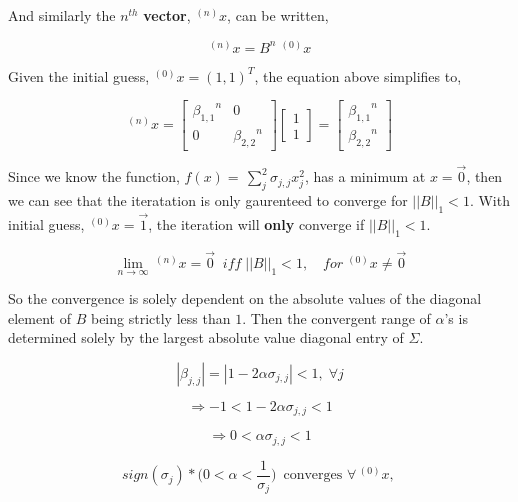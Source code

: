 \documentclass[11pt]{article}
\begin{document}
    And similarly the \(n^{th}\) \textbf{vector}, \(^{(n)}x\), can be
written,

\begin{equation} \tag{2}
^{(n)}x = B^n \; ^{(0)}x
\end{equation}

    Given the initial guess, \(^{(0)}x = (1,1)^{T}\), the equation above
simplifies to,

\begin{equation}
^{(n)}x = 
\begin{bmatrix}
{\beta_{1,1}}^{n} & 0\\
0 & {\beta_{2,2}}^{n}
\end{bmatrix}
\begin{bmatrix}
1 \\
1
\end{bmatrix}
=
\begin{bmatrix}
{\beta_{1,1}}^{n}\\
{\beta_{2,2}}^{n}
\end{bmatrix}
\end{equation}

    Since we know the function,
\(f(x) = \, \sum_{j}^{2} \sigma_{j,j} x_{j}^{2}\), has a minimum at
\(x = \vec{0}\), then we can see that the iteratation is only gaurenteed
to converge for \(||B||_1 < 1\). With initial guess,
\(^{(0)}x = \vec{1}\), the iteration will \textbf{only} converge if
\(||B||_1 < 1\).

    \begin{equation}
\lim_{n \rightarrow \infty} \, ^{(n)}x = \vec{0} \; \; iff \; ||B||_1 < 1, \quad for \; ^{(0)}x \neq \vec{0}
\end{equation}

    So the convergence is solely dependent on the absolute values of the
diagonal element of \(B\) being strictly less than \(1\). Then the
convergent range of \(\alpha\)'s is determined solely by the largest
absolute value diagonal entry of \(\Sigma\).

    \[
|\beta_{j,j}| = |1 - 2 \alpha \sigma_{j,j}| < 1, \; \forall j
\]

\[
\Rightarrow -1 < 1 - 2\alpha \sigma_{j,j} < 1
\]

\[
\Rightarrow 0 < \alpha \sigma_{j,j} < 1
\]

\begin{equation}
 sign(\sigma_{j})* \Big( 0 < \alpha < \frac{1}{\sigma_{j}} \Big) \, \text{ converges } \forall \, ^{(0)}x \text{, }
\end{equation}
\end{document}
